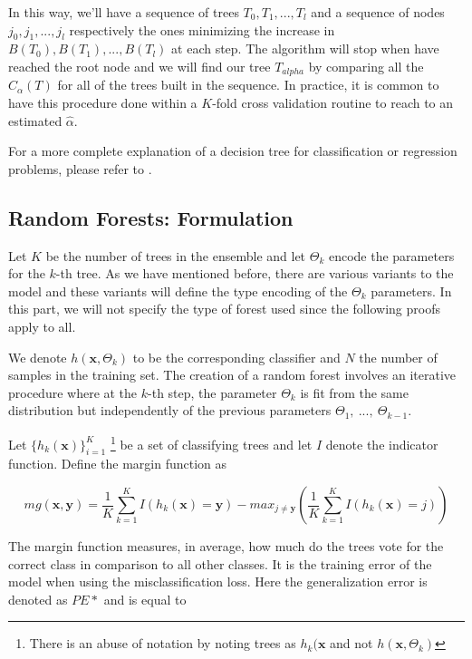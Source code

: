 In this way, we'll have a sequence of trees $T_0,T_1,...,T_l$ and a sequence of nodes $j_0, j_1,...,j_l$ respectively the ones minimizing the increase in $B(T_0),B(T_1),...,B(T_l)$ at each step. The algorithm will stop when have reached the root node and we will find our tree $T_{alpha}$ by comparing all the $C_\alpha(T)$ for all of the trees built in the sequence. In practice, it is common to have this procedure done within a $K$-fold cross validation routine to reach to an estimated $\hat{\alpha}$.

For a more complete explanation of a decision tree for classification or regression problems, please refer to \textcite{breiman-cart84}.

\textit{}

\subsection{ Random Forests: Formulation }


Let $K$ be the number of trees in the ensemble and let $\Theta_k$ encode the parameters for the $k$-th tree. As we have mentioned before, there are various variants to the model and these variants will define the type encoding of the $\Theta_k$ parameters. In this part, we will not specify the type of forest used since the following proofs apply to all.

We denote $h(\textbf{x},\Theta_k)$ to be the corresponding classifier and $N$ the number of samples in the training set. The creation of a random forest involves an iterative procedure where at the $k$-th step, the parameter $\Theta_k$ is fit from the same distribution but independently of the previous parameters $\Theta_1, \ ..., \ \Theta_{k-1}$. %


Let $\{h_k(\textbf{x})\}_{i=1}^K$ \footnote{There is an abuse of notation by noting trees as $h_k(\textbf{x}$ and not $h(\textbf{x}, \Theta_k)$ } be a set of classifying trees and let $I$ denote the indicator function. Define the margin function as

\begin{equation}
mg(\textbf{x},\textbf{y}) = \frac{1}{K}  \sum_{k=1}^K I(h_k(\textbf{x}) = \textbf{y})
- max_{j\neq \textbf{y}}\left(\frac{1}{K} \sum_{k=1}^K I(h_k(\textbf{x}) = j) \right) 
\end{equation} \label{eq:rf-marginFun}

The margin function measures, in average, how much do the trees vote for the correct class in comparison to all other classes. It is the training error of the model when using the misclassification loss. Here the generalization error is denoted as $PE*$ and is equal to 


